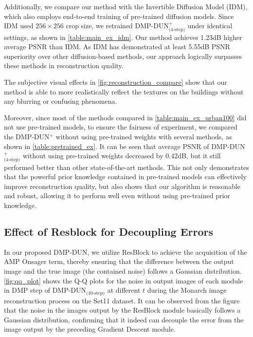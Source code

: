 \documentclass[10pt,twocolumn,letterpaper]{article}
\begin{document}
Additionally, we compare our method with the Invertible Diffusion Model (IDM)\cite{DBLP:journals/corr/abs-2403-17006}, which also employs end-to-end training of pre-trained diffusion models. Since IDM used $256\times 256$ crop size, we retrained DMP-DUN$^+_\text{(4-step)}$ under identical settings, as shown in \cref{table:main_ex_idm}. Our method achieves 1.23dB higher average PSNR than IDM. As IDM has demonstrated at least 5.55dB PSNR superiority over other diffusion-based methods\cite{DBLP:conf/iclr/SongVMK23, DBLP:conf/iclr/ChungKMKY23, DBLP:conf/cvpr/FeiLPZYLZ023, DBLP:conf/nips/RoutRDCDS23, DBLP:journals/pami/SahariaHCSFN23}, our approach logically surpasses these methods in reconstruction quality.

The subjective visual effects in \cref{fig:reconstruction_compare} show that our method is able to more realistically reflect the textures on the buildings without any blurring or confusing phenomena.

Moreover, since most of the methods compared in \cref{table:main_ex_urban100} did not use pre-trained models, to ensure the fairness of experiment, we compared the DMP-DUN$^+$ without using pre-trained weights with several methods\cite{ye2021csformer, DBLP:journals/ijcv/ChenSXZ23, guoCPPNet2024}, as shown in \cref{table:pretrained_ex}. It can be seen that average PSNR of DMP-DUN$^+_\text{(4-step)}$ without using pre-trained weights decreased by 0.42dB, but it still performed better than other state-of-the-art methods. This not only demonstrates that the powerful prior knowledge contained in pre-trained models can effectively improve reconstruction quality, but also shows that our algorithm is reasonable and robust, allowing it to perform well even without using pre-trained prior knowledge.

\subsection{Effect of Resblock for Decoupling Errors}
In our proposed DMP-DUN, we utilize ResBlock to achieve the acquisition of the AMP Onsager term, thereby ensuring that the difference between the output image and the true image (\ie the contained noise) follows a Gaussian distribution. \cref{fig:qq_plot} shows the Q-Q plots for the noise in output images of each module in DMP step of DMP-DUN$_\text{(10-step)}$ at different $ t $ during the Monarch image reconstruction process on the Set11 dataset. It can be observed from the figure that the noise in the images output by the ResBlock module basically follows a Gaussian distribution, confirming that it indeed can decouple the error from the image output by the preceding Gradient Descent module.
\end{document}

